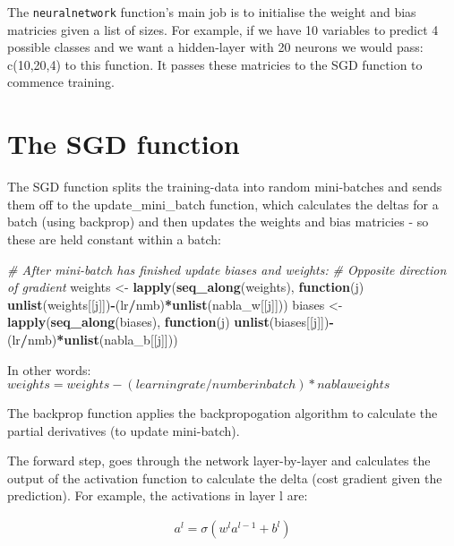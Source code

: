\documentclass[]{book}
\newenvironment{Shaded}{\begin{snugshade}}{\end{snugshade}}
\newcommand{\CommentTok}[1]{\textcolor[rgb]{0.56,0.35,0.01}{\textit{#1}}}
\newcommand{\ControlFlowTok}[1]{\textcolor[rgb]{0.13,0.29,0.53}{\textbf{#1}}}
\newcommand{\KeywordTok}[1]{\textcolor[rgb]{0.13,0.29,0.53}{\textbf{#1}}}
\newcommand{\NormalTok}[1]{#1}
\newcommand{\OperatorTok}[1]{\textcolor[rgb]{0.81,0.36,0.00}{\textbf{#1}}}
\newcommand{\StringTok}[1]{\textcolor[rgb]{0.31,0.60,0.02}{#1}}
\begin{document}
The \texttt{neuralnetwork} function's main job is to initialise the weight and bias matricies given a list of sizes. For example, if we have 10 variables to predict 4 possible classes and we want a hidden-layer with 20 neurons we would pass: c(10,20,4) to this function. It passes these matricies to the SGD function to commence training.

\hypertarget{the-sgd-function}{%
\section{The SGD function}\label{the-sgd-function}}

The SGD function splits the training-data into random mini-batches and sends them off to the update\_mini\_batch function, which calculates the deltas for a batch (using backprop) and then updates the weights and bias matricies - so these are held constant within a batch:

\begin{Shaded}
\begin{Highlighting}[]
\CommentTok{# After mini-batch has finished update biases and weights: }
\CommentTok{# Opposite direction of gradient}
\NormalTok{weights <-}\StringTok{ }\KeywordTok{lapply}\NormalTok{(}\KeywordTok{seq_along}\NormalTok{(weights), }\ControlFlowTok{function}\NormalTok{(j)}
  \KeywordTok{unlist}\NormalTok{(weights[[j]])}\OperatorTok{-}\NormalTok{(lr}\OperatorTok{/}\NormalTok{nmb)}\OperatorTok{*}\KeywordTok{unlist}\NormalTok{(nabla_w[[j]]))}
\NormalTok{biases <-}\StringTok{ }\KeywordTok{lapply}\NormalTok{(}\KeywordTok{seq_along}\NormalTok{(biases), }\ControlFlowTok{function}\NormalTok{(j)}
  \KeywordTok{unlist}\NormalTok{(biases[[j]])}\OperatorTok{-}\NormalTok{(lr}\OperatorTok{/}\NormalTok{nmb)}\OperatorTok{*}\KeywordTok{unlist}\NormalTok{(nabla_b[[j]]))}
\end{Highlighting}
\end{Shaded}

In other words: \(weights = weights - (learning rate/number in batch)*nabla weights\)

The backprop function applies the backpropogation algorithm to calculate the partial derivatives (to update mini-batch).

The forward step, goes through the network layer-by-layer and calculates the output of the activation function to calculate the delta (cost gradient given the prediction). For example, the activations in layer l are:

\[\begin{aligned} 
   a^l = \sigma(w^la^{l-1}+b^l)
\end{aligned}\]
\end{document}
